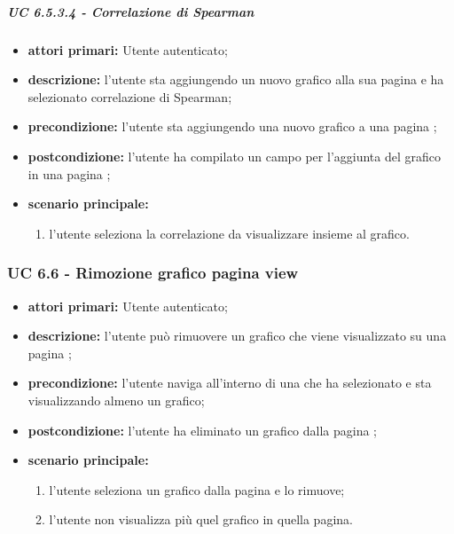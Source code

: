 			\subparagraph{UC 6.5.3.4 - Correlazione di Spearman}
			\begin{itemize}
				\item \textbf{attori primari:} Utente autenticato;
				\item \textbf{descrizione:} l'utente sta aggiungendo un nuovo grafico alla sua pagina  e ha selezionato correlazione di Spearman;
				\item \textbf{precondizione:} l'utente sta aggiungendo una nuovo grafico a una pagina ;
				\item \textbf{postcondizione:} l'utente ha compilato un campo per l'aggiunta del grafico in una pagina ;
				\item \textbf{scenario principale:}
				\begin{enumerate}
					\item{l'utente seleziona la correlazione da visualizzare insieme al grafico.}
				\end{enumerate}	
			\end{itemize}


			\subsubsection{UC 6.6 - Rimozione grafico pagina view}
			\begin{itemize}
				\item \textbf{attori primari:} Utente autenticato;
				\item \textbf{descrizione:} l'utente può rimuovere un grafico che viene visualizzato su una pagina ;
				\item \textbf{precondizione:} l'utente naviga all'interno di una  che ha selezionato e sta visualizzando almeno un grafico;
				\item \textbf{postcondizione:} l'utente ha eliminato un grafico dalla pagina ;
				\item \textbf{scenario principale:}
				\begin{enumerate}
					\item{l'utente seleziona un grafico dalla pagina  e lo rimuove;}
					\item{l'utente non visualizza più quel grafico in quella pagina.}
				\end{enumerate}	
			\end{itemize}